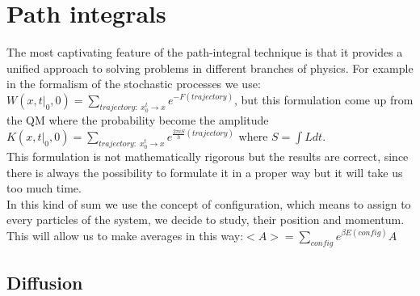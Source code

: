 \documentclass[12pt, english, a4paper]{book}
\begin{document}
\chapter{Path integrals}
The most captivating feature of the path-integral technique is that it provides a unified approach to solving problems in different branches of physics. For example in the formalism of the stochastic processes we use: $W(x,t|_{0},0)=\sum_{trajectory: \; x_0^t\rightarrow x}e^{-F(trajectory)}$, but this formulation come up from the QM where the probability become the amplitude $K(x,t|_{0},0)=\sum_{trajectory: \; x_0^t\rightarrow x}e^{\frac{2\pi iS}{h}(trajectory)}$ where $S=\int L dt$. \\
This formulation is not mathematically rigorous but the results are correct, since there is always the possibility to formulate it in a proper way but it will take us too much time.\\
In this kind of sum we use the concept of configuration, which means to assign to every particles of the system, we decide to study, their position and momentum. This will allow us to make averages in this way:$<A>=\sum_{config}e^{\beta E(config)}A$
\section{Diffusion}
\end{document}
